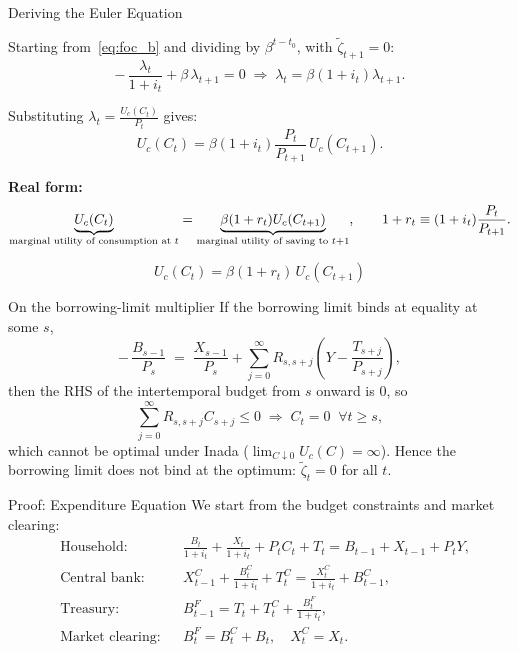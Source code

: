 \documentclass[11pt,aspectratio=169]{beamer}
\begin{document}
\begin{frame}{Deriving the Euler Equation}
\small

Starting from~\eqref{eq:foc_b} and dividing by $\beta^{t-t_0}$, with $\tilde{\zeta}_{t+1}=0$:
\[
-\,\frac{\lambda_t}{1+i_t}+\beta\,\lambda_{t+1}=0
\;\Rightarrow\;
\lambda_t=\beta(1+i_t)\lambda_{t+1}.
\]

Substituting $\lambda_t=\tfrac{U_c(C_t)}{P_t}$ gives:
\[
U_c(C_t)
=\beta(1+i_t)\frac{P_t}{P_{t+1}}\,U_c(C_{t+1}).
\]

\textbf{Real form:}
\[
\underbrace{U_c(C_t)}_{\text{\scriptsize marginal utility of consumption at }t}
=
\underbrace{\beta(1+r_t)U_c(C_{t+1})}_{\text{\scriptsize marginal utility of saving to }t{+}1},
\qquad
1+r_t\equiv(1+i_t)\frac{P_t}{P_{t+1}}.
\]

\[
U_c(C_t)=\beta(1+r_t)\,U_c(C_{t+1})
\]

\vspace{0.2cm}
\begin{center}
\hyperlink{euler}{}
\end{center}

\end{frame}
\begin{frame}{On the borrowing-limit multiplier}
If the borrowing limit binds at equality at some $s$,
\[
-\,\frac{B_{s-1}}{P_s} \;=\; \frac{X_{s-1}}{P_s} + \sum_{j=0}^{\infty} R_{s,s+j}\!\left( Y - \frac{T_{s+j}}{P_{s+j}} \right),
\]
then the RHS of the intertemporal budget from $s$ onward is $0$, so
\[
\sum_{j=0}^{\infty} R_{s,s+j} C_{s+j} \le 0 \;\Rightarrow\; C_{t}=0 \;\; \forall t\ge s,
\]
which cannot be optimal under Inada ($\lim_{C\downarrow 0}U_c(C)=\infty$).
Hence the borrowing limit does not bind at the optimum: $\tilde{\zeta}_t=0$ for all $t$.
\end{frame}

\begin{frame}[label=gdp_proof]{Proof: Expenditure Equation}
We start from the budget constraints and market clearing:
\begin{align}
&\text{Household:} && \frac{B_t}{1+i_t} + \frac{X_t}{1+i_t} + P_t C_t + T_t = B_{t-1} + X_{t-1} + P_t Y, \label{eq:exp_gdp1}\\
&\text{Central bank:} && X_{t-1}^{C} + \frac{B_{t}^{C}}{1+i_t} + T_{t}^{C} = \frac{X_{t}^{C}}{1+i_t} + B_{t-1}^{C}, \label{eq:exp_gdp2}\\
&\text{Treasury:} && B_{t-1}^{F} = T_t + T_t^C + \frac{B_t^F}{1+i_t}, \label{eq:exp_gdp2p5}\\
&\text{Market clearing:} && B_t^F = B_t^C + B_t,\quad X_t^C = X_t. \label{eq:exp_gdp3}
\end{align}
\end{frame}
\end{document}
